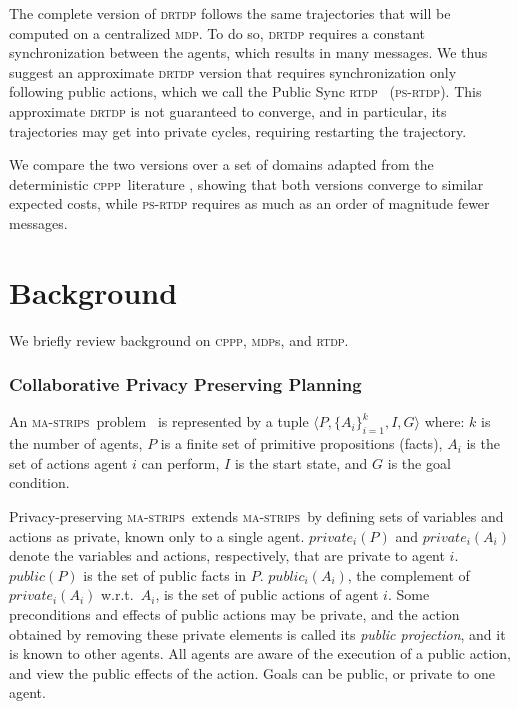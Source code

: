 \documentclass[letterpaper]{article} %
\newcommand{\mastrips}{\textsc {ma-strips}\xspace}
\newcommand{\cppp}{\textsc {cppp}\xspace}
\newcommand{\rtdp}{\textsc {rtdp}\xspace}
\newcommand{\drtdp}{\textsc {drtdp}\xspace}
\newcommand{\psrtdp}{\textsc{ps}-\textsc{rtdp}\xspace}
\newcommand{\mdps}{\textsc {mdp}s\xspace}
\newcommand{\mdp}{\textsc {mdp}\xspace}
\theoremstyle{remark}
\newcommand{\citep}[1]{\cite{#1}}
\begin{document}
The complete version of \drtdp follows the same trajectories that will be computed on a centralized \mdp. To do so, \drtdp requires a constant synchronization between the agents, which results in many messages. We thus suggest an approximate \drtdp version that requires synchronization only following public actions, which we call the Public Sync \rtdp~ (\psrtdp). This approximate \drtdp is not guaranteed to converge, and in particular, its trajectories may get into private cycles, requiring restarting the trajectory.

We compare the two versions over a set of domains adapted from the deterministic \cppp\ literature \cite{vstolba2015competition}, showing that both versions converge to similar expected costs, while \psrtdp requires as much as an order of magnitude fewer messages.



\section{Background}

We briefly review background on \cppp, \mdps, and \rtdp.

\subsubsection{Collaborative Privacy Preserving Planning}

An \mastrips\ problem~\citep{BrafmanD13} is represented by a tuple $\langle P, \{A_i\}_{i=1}^k, I ,G \rangle$ where:
$k$ is the number of agents, $P$ is a finite set of primitive propositions (facts), $A_i$ is the set of actions agent $i$ can perform,  $I$ is the start state, and $G$ is the goal condition.


Privacy-preserving \mastrips\ extends \mastrips\ by defining sets of variables and actions as private, known only to a single agent. $private_i(P)$ and $private_i(A_i)$ denote the variables and actions, respectively, that are private to agent $i$. $public(P)$ is the set of public facts in $P$. $public_i(A_i)$, the complement of $private_i(A_i)$ w.r.t.~$A_i$, is the set of public actions of agent $i$. Some preconditions and effects of public actions may be private, and the action obtained by removing these private elements is called its {\em public projection\/}, and it is known to other agents. All agents are aware of the execution of a public action, and view the public effects of the action. Goals can be public, or private to one agent.
\end{document}
